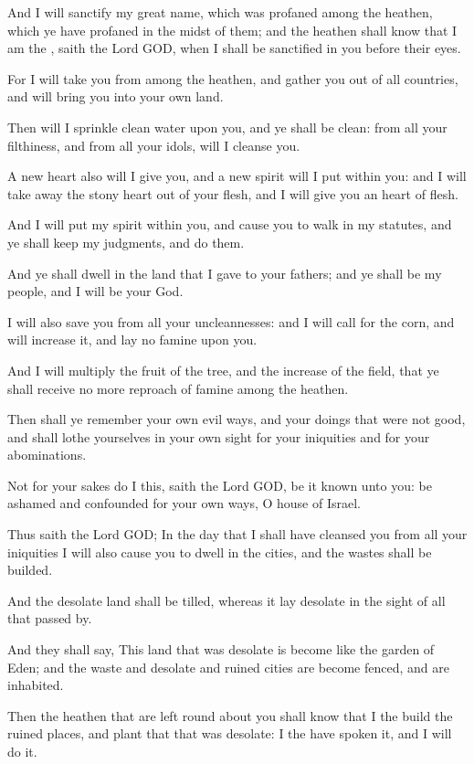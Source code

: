 \verse And I will sanctify my great name, which was profaned among the heathen, which ye have profaned in the midst of them; and the heathen shall know that I am the \LORD, saith the Lord GOD, when I shall be sanctified in you before their eyes.

\verse For I will take you from among the heathen, and gather you out of all countries, and will bring you into your own land.

\verse Then will I sprinkle clean water upon you, and ye shall be clean: from all your filthiness, and from all your idols, will I cleanse you.

\verse A new heart also will I give you, and a new spirit will I put within you: and I will take away the stony heart out of your flesh, and I will give you an heart of flesh.

\verse And I will put my spirit within you, and cause you to walk in my statutes, and ye shall keep my judgments, and do them.

\verse And ye shall dwell in the land that I gave to your fathers; and ye shall be my people, and I will be your God.

\verse I will also save you from all your uncleannesses: and I will call for the corn, and will increase it, and lay no famine upon you.

\verse And I will multiply the fruit of the tree, and the increase of the field, that ye shall receive no more reproach of famine among the heathen.

\verse Then shall ye remember your own evil ways, and your doings that were not good, and shall lothe yourselves in your own sight for your iniquities and for your abominations.

\verse Not for your sakes do I this, saith the Lord GOD, be it known unto you: be ashamed and confounded for your own ways, O house of Israel.

\verse Thus saith the Lord GOD; In the day that I shall have cleansed you from all your iniquities I will also cause you to dwell in the cities, and the wastes shall be builded.

\verse And the desolate land shall be tilled, whereas it lay desolate in the sight of all that passed by.

\verse And they shall say, This land that was desolate is become like the garden of Eden; and the waste and desolate and ruined cities are become fenced, and are inhabited.

\verse Then the heathen that are left round about you shall know that I the \LORD build the ruined places, and plant that that was desolate: I the \LORD have spoken it, and I will do it.

